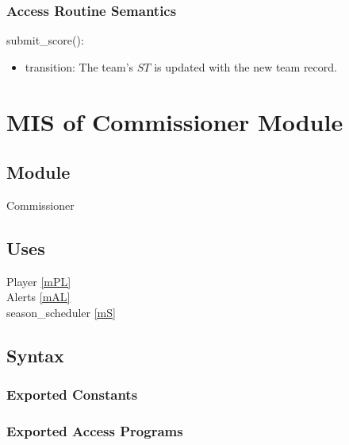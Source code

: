 \documentclass[12pt, titlepage]{article}
\begin{document}

\subsubsection{Access Routine Semantics}

\noindent submit\_score():
\begin{itemize}
\item transition: The team's $ST$ is updated with the new team record.
\end{itemize}

\newpage

\section{MIS of Commissioner Module} \label{mCM}

\subsection{Module}

Commissioner

\subsection{Uses}

Player \ref{mPL}\\
Alerts \ref{mAL}\\
season\_scheduler \ref{mS}

\subsection{Syntax}

\subsubsection{Exported Constants}

\subsubsection{Exported Access Programs}
\end{document}
